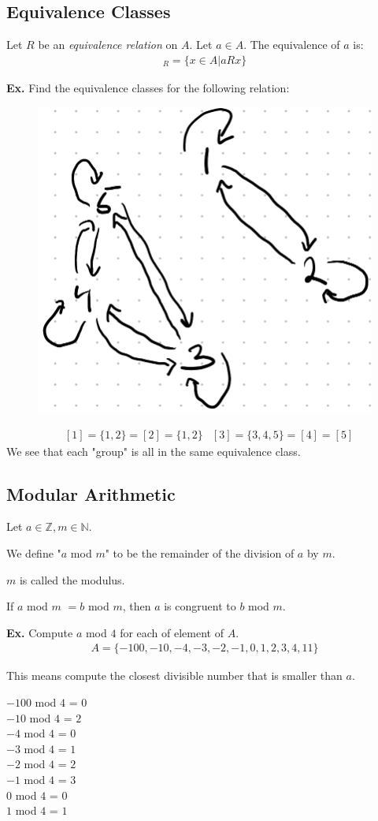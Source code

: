 \documentclass[12pt,letterpaper]{article} \usepackage{amsmath} \usepackage{graphicx}  \usepackage{longtable}  \usepackage{amssymb}
\begin{document}
        \subsection{Equivalence Classes}
        Let $R$ be an \emph{equivalence relation} on $A$. Let $a\in A$. The equivalence of $a$ is:
        \begin{align*}
            [a]_R = \{x\in A | aRx\}
        \end{align*}

        \begin{mdframed}
            \textbf{Ex. } Find the equivalence classes for the following relation:
            \begin{figure}[H]
                \centering
                \includegraphics[width=0.25\linewidth]{ex6.png}
            \end{figure}
            \begin{align*}
                &[1]=\{1,2\} = [2] = \{1,2\} &[3] = \{3,4,5\} = [4]=[5]
            \end{align*}
            We see that each "group" is all in the same equivalence class. 
        \end{mdframed}

        \subsection{Modular Arithmetic}
        Let $a\in \mathbb{Z}, m\in \mathbb{N}$.

        We define "$a$ mod $m$" to be the remainder of the division of $a$ by $m$.

        $m$ is called the modulus.

        If $a$ mod $m$ $= b$ mod $m$, then $a$ is congruent to $b$ mod $m$.

        \begin{mdframed}
            \textbf{Ex.} Compute $a$ mod $4$ for each of element of $A$.
            \begin{align*}
                A = \{-100, -10, -4, -3, -2, -1, 0, 1, 2, 3, 4, 11\}
            \end{align*}

            This means compute the closest divisible number that is smaller than $a$.

            $-100$ mod $4$ = $0$\\
            $-10$ mod $4$ = $2$\\
            $-4$ mod $4$ = $0$\\
            $-3$ mod $4$ = $1$\\
            $-2$ mod $4$ = $2$\\
            $-1$ mod $4$ = $3$\\
            $0$ mod $4$ = $0$\\
            $1$ mod $4$ = $1$
        \end{mdframed}
\end{document}

